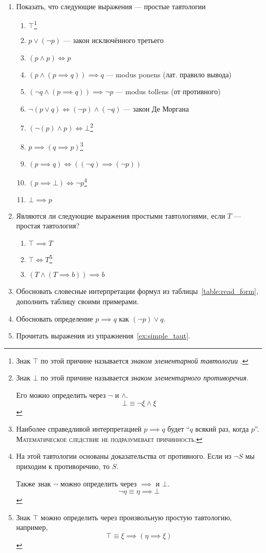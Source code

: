 \begin{enumerate}
	\item{}Показать, что следующие выражения --- простые тавтологии\label{ex:simple_taut}
	\begin{enumerate}
		\item{}$\top$\footnote{Знак $\top$ по этой причине называется
		{\it знаком элементарной тавтологии}
		.}
		\item{}$p\lor (\lnot p)$ --- закон исключённого третьего
		\item{}$(p\land p)\iff p$
		\item{}$(p\land (p\implies q))\implies q$
		--- modus ponens (лат. правило вывода)
		\item{}$(\lnot q\land (p\implies q))\implies \lnot p$
		--- modus tollens (от противного)
		\item{}$\lnot(p\lor q)\iff (\lnot p)\land (\lnot q)$
		--- закон Де Моргана
		\item{}$(\lnot(p)\land p)\iff\bot$\footnote[][-10mm]{
		Знак $\bot$ по этой причине называется
		{\it знаком элементарного противоречия}.

		Его можно определить через $\lnot$ и $\land$.
		\[
			\bot\equiv \lnot \xi\land \xi
		\]
		}
		\item{}$p\implies (q\implies p)$\footnote{
			Наиболее справедливой интерпретацией ${p\implies q}$ будет
			``$q$ всякий раз, когда $p$''.
			\textsc{Математическое следствие не подразумевает причинность.}
		}
		\item{}${(p\implies q)\iff ((\lnot q)\implies (\lnot p))}$
		\item{}$(p\implies\bot)\iff \lnot p$\footnote[][1mm]{
			На этой тавтологии основаны
			доказательства от противного. Если из $\lnot S$ мы приходим
			к противоречию, то $S$.

			Также знак $\lnot$ можно определить через $\implies$ и $\bot$.
			\[
				\lnot\eta\equiv \eta\implies \bot
			\]
		}
		\item{}$\bot \implies p$
	\end{enumerate}
	\item{}Являются ли следующие выражения простыми тавтологиями,
	если $T$ --- простая тавтология?
	\begin{enumerate}
		\item{}$\top \implies T$
		\item{}$\top \iff T$\footnote{
			Знак $\top$ можно определить через произвольную простую тавтологию,
			например,
			\[
				\top\equiv \xi\implies (\eta\implies \xi)
			\]
		}
		\item{}$(T \land (T\implies b))\implies b$
	\end{enumerate}
	\item{}Обосновать словесные интерпретации формул из таблицы~\ref{table:read_form},
	дополнить таблицу своими примерами.
	\item{}Обосновать определение $p\implies q$ как $(\lnot p)\lor q$.
	\item{}Прочитать выражения из упражнения~\ref{ex:simple_taut}.
\end{enumerate}


